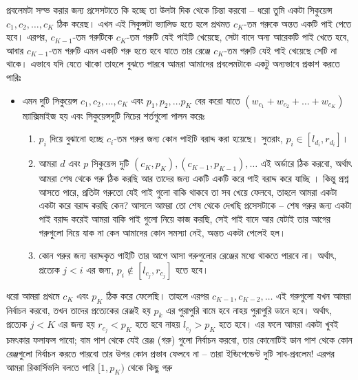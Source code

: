 \begin{solution}
  প্রবলেমটা সল্ভ করার জন্য প্রসেসটাতে কি হচ্ছে তা উলটা দিক থেকে চিন্তা করবো
  -- ধরো তুমি একটা সিকুয়েন্স $c_1, c_2, \ldots, c_K$ ঠিক করেছ। এখন এই
  সিকুন্সটা ভ্যালিড হতে হলে প্রথমত $c_K$-তম গরুকে অন্তত একটি পাই পেতে হবে।
  এরপর, $c_{K-1}$-তম গরুটিকে $c_K$-তম গরুটি যেই পাইটি খেয়েছে, সেটা বাদে অন্য
  আরেকটি পাই খেতে হবে, আবার $c_{K-1}$-তম গরুটি এমন একটি গরু হতে হবে যাতে তার
  রেঞ্জে $c_K$-তম গরুটি যেই পাই খেয়েছে সেটি না থাকে। এভাবে যদি যেতে থাকো
  তাহলে বুঝতে পারবে আমরা আমাদের প্রবলেমটাকে একটু অন্যভাবে প্রকাশ করতে পারিঃ
  \begin{itemize}
    \item এমন দুটি সিকুয়েন্স $c_1, c_2, \ldots, c_K$ এবং $p_1, p_2, \ldots
    p_K$ বের করো যাতে $(w_{c_1} + w_{c_2} + \ldots + w_{c_K})$ ম্যাক্সিমাইজ
    হয় এবং সিকুয়েন্সদুটি নিচের শর্তগুলো পালন
    করেঃ
    \begin{enumerate}
      \item $p_i$ দিয়ে বুঝানো হচ্ছে $c_i$-তম গরুর জন্য কোন পাইটি বরাদ্দ করা
      হয়েছে। সুতরাং, $p_i \in [l_{d_i}, r_{d_i}]$।
      \item আমরা $d$ এবং $p$ সিকুয়েন্স
      দুটি $(c_K, p_K), (c_{K-1}, p_{K-1}), \ldots$ এই অর্ডারে ঠিক করবো,
      অর্থাৎ আমরা
      শেষ থেকে গরু ঠিক করছি আর তাদের জন্য একটি একটি করে পাই বরাদ্দ করে যাচ্ছি
      । কিন্তু প্রশ্ন আসতে পারে, প্রতিটা গরুতো যেই পাই গুলো বাকি থাকবে তা সব
      খেয়ে ফেলবে, তাহলে আমরা একটা একটা করে বরাদ্দ করছি কেন? আসলে আমরা তো শেষ
      থেকে দেখছি প্রসেসটাকে -- শেষ গরুর জন্য একটা পাই বরাদ্দ করেই আমরা বাকি
      পাই গুলো নিয়ে কাজ করছি, সেই পাই বাদে আর যেটাই তার আগের গরুগুলো নিয়ে যাক
      না কেন আমাদের কোন সমস্যা নেই, অন্তত একটা পেলেই হল।
      \item কোন গরুর জন্য বরাদ্দকৃত পাইটি তার আগে আসা গরুগুলোর রেঞ্জের মধ্যে
      থাকতে পারবে না। অর্থাৎ, প্রত্যেক $j < i$ এর জন্য, $p_i \notin [l_{c_j},
      r_{c_j}]$ হতে হবে।
    \end{enumerate}
  \end{itemize}
  ধরো আমরা প্রথমে $c_K$ এবং $p_K$ ঠিক করে ফেলেছি। তাহলে এরপর $c_{K-1},
  c_{K-2}, \ldots$ এই গরুগুলো যখন আমরা নির্বাচন করবো, তখন তাদের প্রত্যেকের
  রেঞ্জই হয় $p_k$ এর পুরাপুরি বামে হবে নাহয় পুরাপুরি ডানে হবে। অর্থাৎ,
  প্রত্যেক $j < K$ এর জন্য হয় $r_{c_j} < p_K$ হতে হবে নাহয় $l_{c_j} > p_K$
  হতে হবে। এর ফলে আমরা একটা খুবই চমৎকার ফলাফল পাবো; বাম পাশ থেকে যেই রেঞ্জ
  (গরু) গুলো নির্বাচন করবো, তার কোনোটিই ডান পাশ থেকে কোন রেঞ্জগুলো নির্বাচন
  করতে পারবো তার উপর কোন প্রভাব ফেলবে না -- তারা ইন্ডিপেন্ডেন্ট দুটি
  সাব-প্রবলেম! এরপর আমরা রিকার্সিভলি বলতে পারি $[1, p_K)$ থেকে কিছু গরু

\end{solution}
